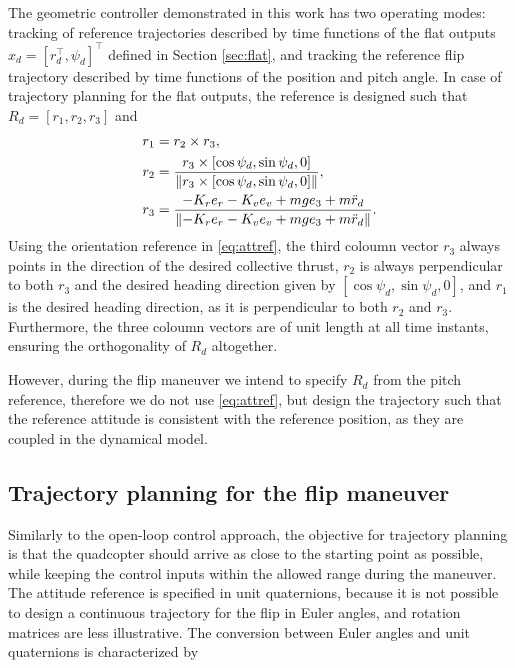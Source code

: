 The geometric controller demonstrated in this work has two operating modes: tracking of reference trajectories described by time functions of the flat outputs $x_d=[r_d^\top, \psi_d]^\top$ defined in Section \ref{sec:flat}, and tracking the reference flip trajectory described by time functions of the position and pitch angle. In case of trajectory planning for the flat outputs, the reference is designed such that $R_d=[r_1, r_2, r_3]$ and \cite{turpinkumar2011}
\begin{subequations}\label{eq:attref}
\begin{align}
    r_1 &= r_2\times r_3,\\
    r_2 &= \frac{r_3\times [\cos\psi_d, \sin\psi_d, 0]}{\norm{r_3\times [\cos\psi_d, \sin\psi_d, 0]}},\\
    r_3 &= \frac{-K_r e_r - K_v e_v + m g e_3+m \ddot r_d}{\norm{-K_r e_r - K_v e_v + m g e_3+m \ddot r_d}}.
\end{align}
\end{subequations}
Using the orientation reference in \eqref{eq:attref}, the third coloumn vector $r_3$ always points in the direction of the desired collective thrust, $r_2$ is always perpendicular to both $r_3$ and the desired heading direction given by $[\cos\psi_d, \sin\psi_d, 0]$, and $r_1$ is the desired heading direction, as it is perpendicular to both $r_2$ and $r_3$. Furthermore, the three coloumn vectors are of unit length at all time instants, ensuring the orthogonality of $R_d$ altogether.

However, during the flip maneuver we intend to specify $R_d$ from the pitch reference, therefore we do not use \eqref{eq:attref}, but design the trajectory such that the reference attitude is consistent with the reference position, as they are coupled in the dynamical model.  


\subsection{Trajectory planning for the flip maneuver}

Similarly to the open-loop control approach, the objective for trajectory planning is that the quadcopter should arrive as close to the starting point as possible, while keeping the control inputs within the allowed range during the maneuver. The attitude reference is specified in unit quaternions, because it is not possible to design a continuous trajectory for the flip in Euler angles, and rotation matrices are less illustrative. The conversion between Euler angles and unit quaternions is characterized by \cite{quaternion}

